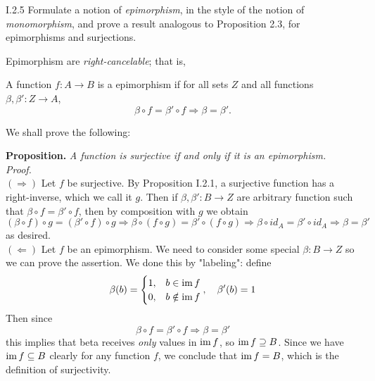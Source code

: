 \begin{problem}{I.2.5}
Formulate a notion of \emph{epimorphism}, in the style of the notion of \emph{monomorphism}, and prove a result analogous to Proposition 2.3, for epimorphisms and surjections.
\end{problem}
\begin{sol}
Epimorphism are \emph{right-cancelable}; that is,
\begin{center}
A function $f : A \to B$ is a epimorphism if for all sets $Z$ and all functions $\beta, \beta' : Z \to A$, 
\[
\beta \circ f = \beta' \circ f \Longrightarrow \beta = \beta'.
\]
\end{center}
We shall prove the following:

\noindent \textbf{Proposition. }\textit{A function is surjective if and only if it is an epimorphism.} \\
\textit{Proof. } \\
$(\Rightarrow)$ Let $f$ be surjective. By Proposition I.2.1, a surjective function has a right-inverse, which we call it $g$. Then if $\beta, \beta' : B \to Z$ are arbitrary function such that $\beta \circ f = \beta' \circ f$, then by composition with $g$ we obtain
\[
(\beta \circ f) \circ g=  (\beta' \circ f) \circ g \Rightarrow \beta \circ (f \circ g)=  \beta' \circ  (f \circ g) \Rightarrow \beta \circ id_A = \beta' \circ id_A \Rightarrow \beta = \beta'
\]
as desired. \\
$(\Leftarrow)$ Let $f$ be an epimorphism. We need to consider some special $\beta:B \to Z$ so we can prove the assertion. We done this by "labeling": define
\[
\beta(b) = \begin{cases}
    1, &b \in \operatorname{im} f \\
    0, &b \notin \operatorname{im} f
\end{cases}, \quad \beta'(b) = 1
\]
Then since 
\[
\beta \circ f = \beta' \circ f  \Rightarrow \beta = \beta'
\] 
this implies that beta receives \emph{only} values in $\operatorname{im} f$, so $\operatorname{im} f \supseteq B$. Since we have $\operatorname{im} f \subseteq B$ clearly for any function $f$, we conclude that $\operatorname{im} f = B$, which is the definition of surjectivity.
\end{sol}

